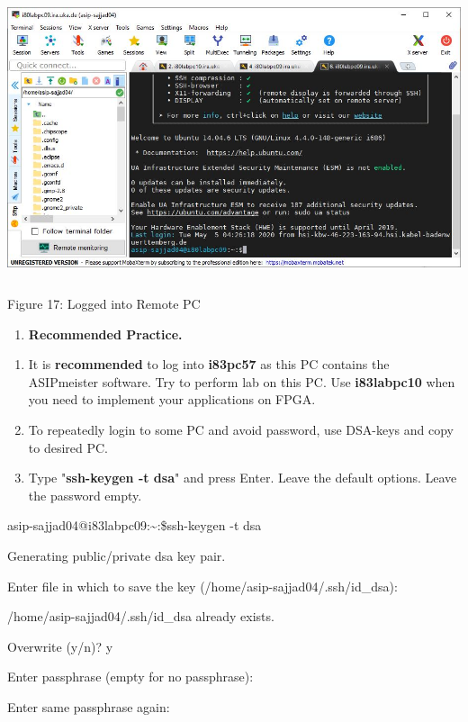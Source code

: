 \documentclass{article}
\begin{document}
\includegraphics[width=5.70556in,height=3.27527in]{images/media/image17.JPG}

Figure 17: Logged into Remote PC

\begin{enumerate}
\def\labelenumi{\Alph{enumi}.}
\setcounter{enumi}{8}
\item
  \textbf{Recommended Practice.}
\end{enumerate}

\begin{enumerate}
\def\labelenumi{\arabic{enumi}.}
\setcounter{enumi}{7}
\item
  It is \textbf{recommended} to log into \textbf{i83pc57} as this PC
  contains the ASIPmeister software. Try to perform lab on this PC. Use
  \textbf{i83labpc10} when you need to implement your applications on
  FPGA.
\item
  To repeatedly login to some PC and avoid password, use DSA-keys and
  copy to desired PC.
\item
  Type "\textbf{ssh-keygen -t dsa}" and press Enter. Leave the default
  options. Leave the password empty.
\end{enumerate}

asip-sajjad04@i83labpc09:\textasciitilde:\$ssh-keygen -t dsa

Generating public/private dsa key pair.

Enter file in which to save the key (/home/asip-sajjad04/.ssh/id\_dsa):

/home/asip-sajjad04/.ssh/id\_dsa already exists.

Overwrite (y/n)? y

Enter passphrase (empty for no passphrase):

Enter same passphrase again:
\end{document}
